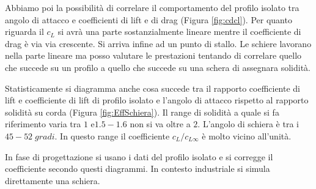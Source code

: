 Abbiamo poi la possibilità di correlare il comportamento del profilo isolato tra angolo di attacco e coefficienti di lift e di drag (Figura \ref{fig:cdcl}). Per quanto riguarda il $c_L$ si avrà una parte sostanzialmente lineare mentre il coefficiente di drag è via via crescente. Si arriva infine ad un punto di stallo. Le schiere lavorano nella parte lineare ma posso valutare le prestazioni tentando di correlare quello che succede su un profilo a quello che succede su una schera di assegnara solidità.

Statisticamente si diagramma anche cosa succede tra il rapporto coefficiente di lift e coefficiente di lift di profilo isolato e l'angolo di attacco rispetto al rapporto solidità su corda (Figura \ref{fig:EffSchiera}). 
Il range di solidità a quale si fa riferimento varia tra $1$ e$ 1.5 - 1.6$ non si va oltre a $2$. L'angolo di schiera è tra i $45 - 52 \; gradi$. In questo range il coefficiente $c_L / c_{L \infty}$ è molto vicino all'unità. 

In fase di progettazione si usano i dati del profilo isolato e si corregge il coefficiente secondo questi diagrammi. In contesto industriale si simula direttamente una schiera. 


